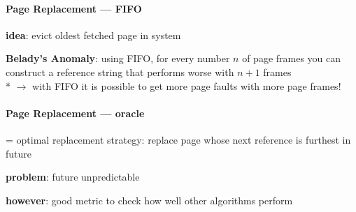\paragraph{Page Replacement --- FIFO}
\begin{items}
  \item \textbf{idea}: evict oldest fetched page in system
  \item \textbf{Belady's Anomaly}: using FIFO, for every number $ n $ of page frames you can construct a reference string that performs worse with $ n+1 $ frames \\*
  $ \to $ with FIFO it is possible to get more page faults with more page frames!
\end{items}

\paragraph{Page Replacement --- oracle}
\begin{items}
  \item = optimal replacement strategy: replace page whose next reference is furthest in future
  \item \textbf{problem}: future unpredictable
  \item \textbf{however}: good metric to check how well other algorithms perform
\end{items}

